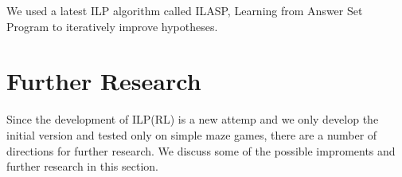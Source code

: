 We used a latest ILP algorithm called ILASP, Learning from Answer Set Program to iteratively improve hypotheses.

\section{Further Research}
\label{sec:further_research}

Since the development of ILP(RL) is a new attemp and we only develop the initial version and tested only on simple maze games, 
there are a number of directions for further research. We discuss some of the possible improments and further research in this section.

